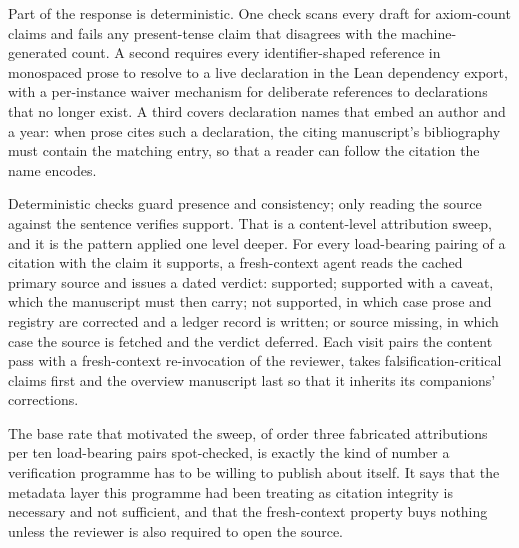 \documentclass[11pt]{article}
\begin{document}
Part of the response is deterministic. One check scans every draft
for axiom-count claims and fails any present-tense claim that
disagrees with the machine-generated count. A second requires every
identifier-shaped reference in monospaced prose to resolve to a live
declaration in the Lean dependency export, with a per-instance waiver
mechanism for deliberate references to declarations that no longer
exist. A third covers declaration names that embed an author and a
year: when prose cites such a declaration, the citing manuscript's
bibliography must contain the matching entry, so that a reader can
follow the citation the name encodes.

Deterministic checks guard presence and consistency; only reading the
source against the sentence verifies support. That is a content-level
attribution sweep, and it is the pattern applied one level deeper.
For every load-bearing pairing of a citation with the claim it
supports, a fresh-context agent reads the cached primary source and
issues a dated verdict: supported; supported with a caveat, which the
manuscript must then carry; not supported, in which case prose and
registry are corrected and a ledger record is written; or source
missing, in which case the source is fetched and the verdict
deferred. Each visit pairs the content pass with a fresh-context
re-invocation of the reviewer, takes falsification-critical claims
first and the overview manuscript last so that it inherits its
companions' corrections.

The base rate that motivated the sweep, of order three fabricated
attributions per ten load-bearing pairs spot-checked, is exactly the
kind of number a verification programme has to be willing to publish
about itself. It says that the metadata layer this programme had been
treating as citation integrity is necessary and not sufficient, and
that the fresh-context property buys nothing unless the reviewer is
also required to open the source.
\end{document}
